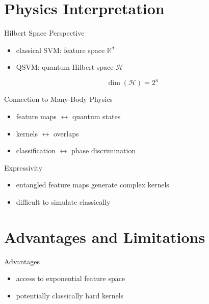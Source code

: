 \documentclass{beamer}
\begin{document}
\section{Physics Interpretation}

\begin{frame}{Hilbert Space Perspective}
\begin{itemize}
\item classical SVM: feature space $\mathbb{R}^d$
\item QSVM: quantum Hilbert space $\mathcal{H}$
\end{itemize}

\medskip

\[
\dim(\mathcal{H}) = 2^n
\]
\end{frame}


\begin{frame}{Connection to Many-Body Physics}
\begin{itemize}
\item feature maps $\leftrightarrow$ quantum states
\item kernels $\leftrightarrow$ overlaps
\item classification $\leftrightarrow$ phase discrimination
\end{itemize}
\end{frame}


\begin{frame}{Expressivity}
\begin{itemize}
\item entangled feature maps generate complex kernels
\item difficult to simulate classically
\end{itemize}
\end{frame}


\section{Advantages and Limitations}

\begin{frame}{Advantages}
\begin{itemize}
\item access to exponential feature space
\item potentially classically hard kernels
\end{itemize}
\end{frame}
\end{document}
